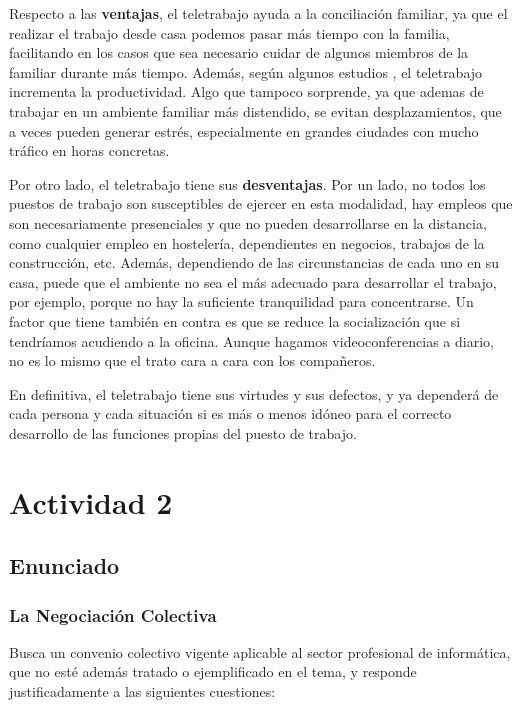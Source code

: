 Respecto a las \textbf{ventajas}, el teletrabajo ayuda a la conciliación familiar, ya que el realizar el trabajo desde casa podemos pasar más tiempo con la familia, facilitando en los casos que sea necesario cuidar de algunos miembros de la familiar durante más tiempo. Además, según algunos estudios \cite{bussi}, el teletrabajo incrementa la productividad. Algo que tampoco sorprende, ya que ademas de trabajar en un ambiente familiar más distendido, se evitan desplazamientos, que a veces pueden generar estrés, especialmente en grandes ciudades con mucho tráfico en horas concretas.

Por otro lado, el teletrabajo tiene sus \textbf{desventajas}. Por un lado, no todos los puestos de trabajo son susceptibles de ejercer en esta modalidad, hay empleos que son necesariamente presenciales y que no pueden desarrollarse en la distancia, como cualquier empleo en hostelería, dependientes en negocios, trabajos de la construcción, etc. Además, dependiendo de las circunstancias de cada uno en su casa, puede que el ambiente no sea el más adecuado para desarrollar el trabajo, por ejemplo, porque no hay la suficiente tranquilidad para concentrarse. Un factor que tiene también en contra es que se reduce la socialización que si tendríamos acudiendo a la oficina. Aunque hagamos videoconferencias a diario, no es lo mismo que el trato cara a cara con los compañeros.

En definitiva, el teletrabajo tiene sus virtudes y sus defectos, y ya dependerá de cada persona y cada situación si es más o menos idóneo para el correcto desarrollo de las funciones propias del puesto de trabajo.

\section{Actividad 2}
\subsection{Enunciado}

\subsubsection*{La Negociación Colectiva}
Busca un convenio colectivo vigente aplicable al sector profesional de informática, que no esté además tratado o ejemplificado en el tema, y responde justificadamente a las siguientes cuestiones:

